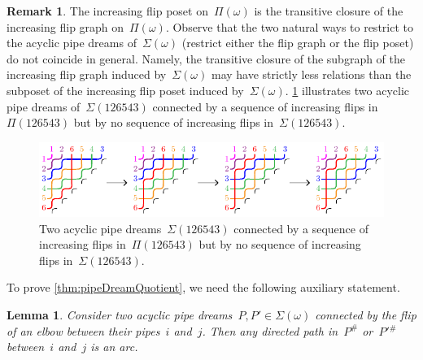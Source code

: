 \documentclass{amsart}
\newtheorem{lemma}[theorem]{Lemma}
\theoremstyle{definition}
\newtheorem{remark}[theorem]{Remark}
\newcommand{\pipeDreams}{\Pi} %
\newcommand{\contact}{^\#} %
\newcommand{\acyclicPipeDreams}{\Sigma} %
\begin{document}
\begin{remark}
\label{rem:pipeDreamQuotient}
The increasing flip poset on~$\pipeDreams(\omega)$ is the transitive closure of the increasing flip graph on~$\pipeDreams(\omega)$.
Observe that the two natural ways to restrict to the acyclic pipe dreams of~$\acyclicPipeDreams(\omega)$ (restrict either the flip graph or the flip poset) do not coincide in general.
Namely, the transitive closure of the subgraph of the increasing flip graph induced by~$\acyclicPipeDreams(\omega)$ may have strictly less relations than the subposet of the increasing flip poset induced by~$\acyclicPipeDreams(\omega)$.
\cref{fig:counterExampleRestrictionIncreasingFlipPoset} illustrates two acyclic pipe dreams of~$\acyclicPipeDreams(126543)$ connected by a sequence of increasing flips in~$\pipeDreams(126543)$ but by no sequence of increasing flips in~$\acyclicPipeDreams(126543)$.

\begin{figure}[ht]
	\centerline{\includegraphics[scale=1.3]{counterExampleRestrictionIncreasingFlipPoset}}
	\caption{Two acyclic pipe dreams~$\acyclicPipeDreams(126543)$ connected by a sequence of increasing flips in~$\pipeDreams(126543)$ but by no sequence of increasing flips in~$\acyclicPipeDreams(126543)$.}
	\label{fig:counterExampleRestrictionIncreasingFlipPoset}
\end{figure}
\end{remark}

To prove \cref{thm:pipeDreamQuotient}, we need the following auxiliary statement.

\begin{lemma}
\label{lem:flippable}
Consider two acyclic pipe dreams~$P,P' \in \acyclicPipeDreams(\omega)$ connected by the flip of an elbow between their pipes~$i$ and~$j$.
Then any directed path in~$P\contact$ or~$P'{}\contact$ between~$i$ and~$j$ is an arc.
\end{lemma}
\end{document}
